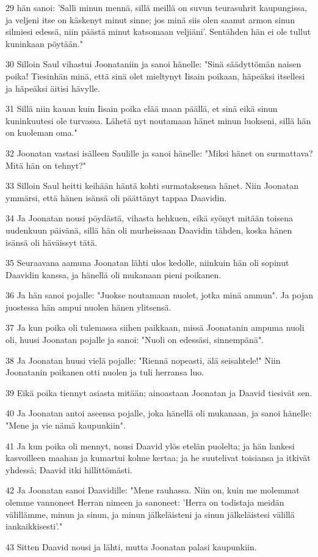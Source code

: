 \par 29 hän sanoi: 'Salli minun mennä, sillä meillä on suvun teurasuhrit kaupungissa, ja veljeni itse on käskenyt minut sinne; jos minä siis olen saanut armon sinun silmiesi edessä, niin päästä minut katsomaan veljiäni'. Sentähden hän ei ole tullut kuninkaan pöytään."
\par 30 Silloin Saul vihastui Joonataniin ja sanoi hänelle: "Sinä säädyttömän naisen poika! Tiesinhän minä, että sinä olet mieltynyt Iisain poikaan, häpeäksi itsellesi ja häpeäksi äitisi hävylle.
\par 31 Sillä niin kauan kuin Iisain poika elää maan päällä, et sinä eikä sinun kuninkuutesi ole turvassa. Lähetä nyt noutamaan hänet minun luokseni, sillä hän on kuoleman oma."
\par 32 Joonatan vastasi isälleen Saulille ja sanoi hänelle: "Miksi hänet on surmattava? Mitä hän on tehnyt?"
\par 33 Silloin Saul heitti keihään häntä kohti surmataksensa hänet. Niin Joonatan ymmärsi, että hänen isänsä oli päättänyt tappaa Daavidin.
\par 34 Ja Joonatan nousi pöydästä, vihasta hehkuen, eikä syönyt mitään toisena uudenkuun päivänä, sillä hän oli murheissaan Daavidin tähden, koska hänen isänsä oli häväissyt tätä.
\par 35 Seuraavana aamuna Joonatan lähti ulos kedolle, niinkuin hän oli sopinut Daavidin kanssa, ja hänellä oli mukanaan pieni poikanen.
\par 36 Ja hän sanoi pojalle: "Juokse noutamaan nuolet, jotka minä ammun". Ja pojan juostessa hän ampui nuolen hänen ylitsensä.
\par 37 Ja kun poika oli tulemassa siihen paikkaan, missä Joonatanin ampuma nuoli oli, huusi Joonatan pojalle ja sanoi: "Nuoli on edessäsi, sinnempänä".
\par 38 Ja Joonatan huusi vielä pojalle: "Riennä nopeasti, älä seisahtele!" Niin Joonatanin poikanen otti nuolen ja tuli herransa luo.
\par 39 Eikä poika tiennyt asiasta mitään; ainoastaan Joonatan ja Daavid tiesivät sen.
\par 40 Ja Joonatan antoi aseensa pojalle, joka hänellä oli mukanaan, ja sanoi hänelle: "Mene ja vie nämä kaupunkiin".
\par 41 Ja kun poika oli mennyt, nousi Daavid ylös etelän puolelta; ja hän lankesi kasvoilleen maahan ja kumartui kolme kertaa; ja he suutelivat toisiansa ja itkivät yhdessä; Daavid itki hillittömästi.
\par 42 Ja Joonatan sanoi Daavidille: "Mene rauhassa. Niin on, kuin me molemmat olemme vannoneet Herran nimeen ja sanoneet: 'Herra on todistaja meidän välillämme, minun ja sinun, ja minun jälkeläisteni ja sinun jälkeläistesi välillä iankaikkisesti'."
\par 43 Sitten Daavid nousi ja lähti, mutta Joonatan palasi kaupunkiin.

